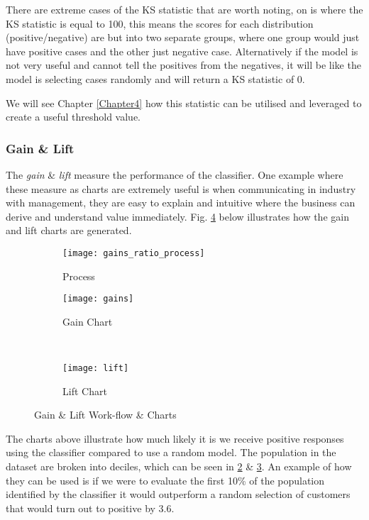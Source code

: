 There are extreme cases of the KS statistic that are worth noting, on is where the KS statistic is equal to 100, this means the scores for each distribution (positive/negative) are but into two separate groups, where one group would just have positive cases and the other just negative case. Alternatively if the model is not very useful and cannot tell the positives from the negatives, it will be like the model is selecting cases randomly and will return a KS statistic of 0.

We will see Chapter \ref{Chapter4} how this statistic can be utilised and leveraged to create a useful threshold value. 

\subsubsection{Gain \& Lift}
The \textit{gain} \& \textit{lift} measure the performance of the classifier. One example where these measure as charts are extremely useful is when communicating in industry with management, they are easy to explain and intuitive where the business can derive and understand value immediately. Fig. \ref{fig:GainLiftWorkflowCharts} below illustrates how the gain and lift charts are generated. 

\begin{figure}[H]
	\centering
	\begin{subfigure}[b]{0.90\textwidth}
		\captionsetup{font=scriptsize}
		\texttt{[image: gains\_ratio\_process]}\caption{Process}\label{fig:gains_ratio_process}
	\end{subfigure} 
	\medskip
	\newline
	\begin{subfigure}[b]{0.45\textwidth}
		\captionsetup{font=scriptsize}
		\texttt{[image: gains]}
		\caption{Gain Chart}\label{fig:gains}
	\end{subfigure} ~\quad
	\begin{subfigure}[b]{0.45\textwidth}
		\captionsetup{font=scriptsize}
		\texttt{[image: lift]}
		\caption{Lift Chart}\label{fig:lift}
	\end{subfigure}
	\caption{Gain \& Lift Work-flow \& Charts}
	\label{fig:GainLiftWorkflowCharts}
\end{figure}

The charts above illustrate how much likely it is we receive positive responses using the classifier compared to use a random model. The population in the dataset are broken into deciles, which can be seen in \ref{fig:gains} \& \ref{fig:lift}. An example of how they can be used is if we were to evaluate the first 10\% of the population identified by the classifier it would outperform a random selection of customers that would turn out to positive by 3.6.

